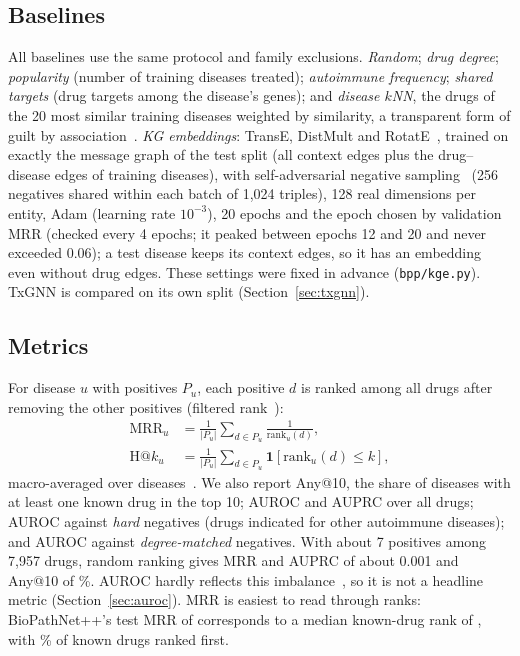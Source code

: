 \documentclass{ieeeaccess}
\newcommand{\sysname}{BioPathNet++\xspace}
\begin{document}
\subsection{Baselines}
All baselines use the same protocol and family exclusions. \emph{Random}; \emph{drug degree}; \emph{popularity} (number of training diseases treated); \emph{autoimmune frequency}; \emph{shared targets} (drug targets among the disease's genes); and \emph{disease $k$NN}, the drugs of the 20 most similar training diseases weighted by similarity, a transparent form of guilt by association~\cite{bang2023dreamwalk}. \emph{KG embeddings}: TransE, DistMult and RotatE~\cite{bordes2013transe,yang2015distmult,sun2019rotate}, trained on exactly the message graph of the test split (all context edges plus the drug--disease edges of training diseases), with self-adversarial negative sampling~\cite{sun2019rotate} (256 negatives shared within each batch of 1,024 triples), 128 real dimensions per entity, Adam (learning rate $10^{-3}$), 20 epochs and the epoch chosen by validation MRR (checked every 4 epochs; it peaked between epochs 12 and 20 and never exceeded 0.06); a test disease keeps its context edges, so it has an embedding even without drug edges. These settings were fixed in advance (\texttt{bpp/kge.py}). TxGNN is compared on its own split (Section~\ref{sec:txgnn}).

\subsection{Metrics}
For disease $u$ with positives $P_u$, each positive $d$ is ranked among all drugs after removing the other positives (filtered rank~\cite{bordes2013transe}):
\begin{align}
\mathrm{MRR}_u&=\frac{1}{|P_u|}\sum_{d\in P_u}\frac{1}{\mathrm{rank}_u(d)},\\
\mathrm{H@}k_u&=\frac{1}{|P_u|}\sum_{d\in P_u}\mathbf{1}[\mathrm{rank}_u(d)\le k],
\end{align}
macro-averaged over diseases~\cite{voorhees1999trec}. We also report Any@10, the share of diseases with at least one known drug in the top 10; AUROC and AUPRC over all drugs; AUROC against \emph{hard} negatives (drugs indicated for other autoimmune diseases); and AUROC against \emph{degree-matched} negatives. With about 7 positives among 7,957 drugs, random ranking gives MRR and AUPRC of about 0.001 and Any@10 of \RandExpAnyTenTest\%. AUROC hardly reflects this imbalance~\cite{saito2015prc}, so it is not a headline metric (Section~\ref{sec:auroc}). MRR is easiest to read through ranks: \sysname's test MRR of \TestMrr{} corresponds to a median known-drug rank of \MedRankTest, with \RankOneShareTest\% of known drugs ranked first.
\end{document}
